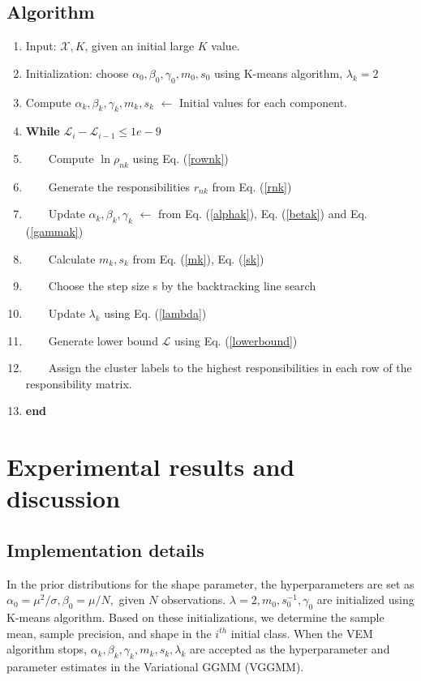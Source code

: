 \documentclass[conference]{IEEEtran}
\begin{document}
\subsection*{\textbf{Algorithm}}
\begin{enumerate}
    \item Input: $\mathcal{X}, K$, given an initial large $K$ value.
    \item Initialization: choose  $\alpha_0, \beta_0, \gamma_0, m_0, s_0 $ using K-means algorithm, $\lambda_k = 2$
    \item Compute $\alpha_k, \beta_k, \gamma_k, m_k, s_k$ $\leftarrow$ Initial values for each component.
    \item \textbf{While} $\mathcal{L}_i - \mathcal{L}_{i-1} \le 1e-9$ 
    \item $\quad\quad$Compute $\ln \rho_{nk}$ using Eq. (\ref{rownk})
    \item $\quad\quad$Generate the responsibilities $r_{nk}$ from Eq. (\ref{rnk})
    \item $\quad\quad$Update $\alpha_k, \beta_k, \gamma_k$ $\leftarrow$ from Eq. (\ref{alphak}), Eq. (\ref{betak}) and
    Eq. (\ref{gammak})
    \item $\quad\quad$Calculate $m_k, s_k$ from Eq. (\ref{mk}), Eq. (\ref{sk}) 
    \item $\quad\quad$Choose the step size s by the backtracking line search
    \item $\quad\quad$Update $\lambda_k$ using Eq. (\ref{lambda})
    \item $\quad\quad$Generate lower bound $\mathcal{L}$ using Eq. (\ref{lowerbound})
    \item $\quad\quad$Assign the cluster labels to the highest responsibilities in each row of the responsibility matrix.
    \item \textbf{end}
    
\end{enumerate}
\section{Experimental results and discussion}
\subsection{Implementation details}
In the prior distributions for the shape parameter, the hyperparameters are set as $\alpha_0 = \mu^2/\sigma, \beta_0 = \mu/N, $ given $N$ observations. $\lambda=2, m_0, s_0^{-1}, \gamma_0$ are initialized using K-means algorithm.
Based on these initializations, we determine the sample mean, sample precision, and shape in the $i^{th}$ initial class.
When the VEM algorithm stops, $\alpha_k, \beta_k, \gamma_k, m_k, s_k, \lambda_k$ are accepted as the hyperparameter and parameter estimates in the Variational GGMM (VGGMM).
\end{document}
